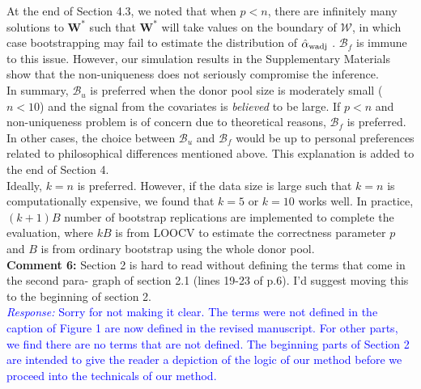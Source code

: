 \documentclass[12pt]{article}
\newcommand{\response}[1]{\noindent \textcolor{blue}{\emph{Response:} #1}}
\begin{document}
{At the end of Section 4.3, we noted that when $p < n$, there are infinitely many solutions to $\mathbf{W}^*$ such that $\mathbf{W}^*$ will take values on the boundary of $\mathcal{W}$, in which case bootstrapping may fail to estimate the distribution of $\hat{\alpha}_{\rm wadj}$ \citep{andrews2000inconsistency}. $\mathcal{B}_f$  is immune to this issue. However, our simulation results in the Supplementary Materials show that the non-uniqueness does not seriously compromise the inference. \\



In summary, $\mathcal{B}_u$ is preferred when  the donor pool size is moderately small ($n< 10$) and the signal from the covariates is \emph{believed} to be large. If $p < n$ and non-uniqueness problem is of concern due to theoretical reasons,  $\mathcal{B}_f$ is preferred. In other cases, the choice between  $\mathcal{B}_u$  and  $\mathcal{B}_f$ would be up to personal preferences related to philosophical differences mentioned above. This explanation is added to the end of Section 4.  \\

Ideally, $k=n$ is preferred. However, if the data size is large such that $k=n$ is computationally expensive, we found that $k = 5$ or $k = 10$ works well. In practice, $(k+1) B$ number of bootstrap replications are implemented to complete the evaluation, where $k B$ is from LOOCV to estimate the correctness parameter $p$ and $B$ is from ordinary bootstrap using the whole donor pool. } \\

{\bf Comment 6:} Section 2 is hard to read without defining the terms that come in the second para- graph of section 2.1 (lines 19-23 of p.6). I'd suggest moving this to the beginning of section 2. \\

\response{Sorry for not making it clear. The terms were not defined in the caption of Figure 1 are now defined in the revised manuscript. For other parts, we find there are no terms that are not defined. The beginning parts of Section 2 are intended to give the reader a depiction of the logic of our method before we proceed into the technicals of our method. }


\end{document}
